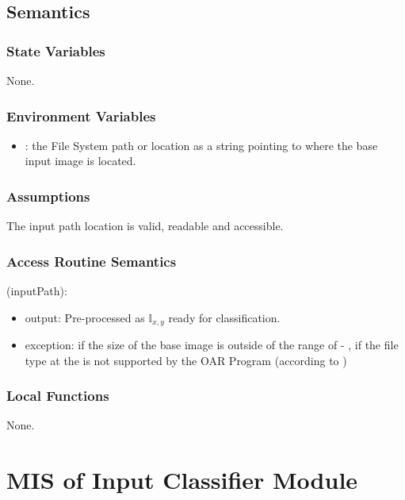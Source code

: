\documentclass[12pt, titlepage]{article}
\begin{document}
\subsection{Semantics}

\subsubsection{State Variables}

None.

\subsubsection{Environment Variables}

\begin{itemize}
  \item {}: the File System path or location as a string pointing to where the base input image is located.
\end{itemize}

\subsubsection{Assumptions}

The input path location is valid, readable and accessible.

\subsubsection{Access Routine Semantics}

\noindent {}(inputPath):
\begin{itemize}
\item output: Pre-processed  as $\mathbb{I}_{x, y}$ ready for classification.
\item exception:  if the size of the base image is outside of the range of 
 - ,  if the file type at the  is not 
supported by the OAR Program (according to )
\end{itemize}

\subsubsection{Local Functions}

None.


\section{MIS of Input Classifier Module} \label{ModuleIC} 
\end{document}
